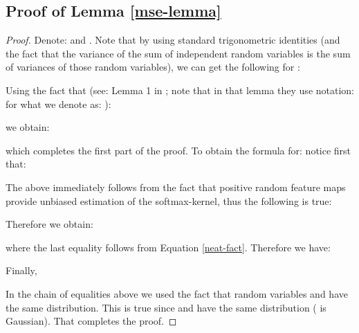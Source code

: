 \subsection{Proof of Lemma \ref{mse-lemma}}
\begin{proof}
Denote:  and .
Note that by using standard trigonometric identities (and the fact that the variance of the sum of independent random variables is the sum of variances of those random variables), we can get the following for :

Using the fact that (see: Lemma 1 in \citep{ort}; note that in that lemma they use notation:  for what we denote as: ):

we obtain:

which completes the first part of the proof.
To obtain the formula for: 
notice first that:

The above immediately follows from the fact that positive random feature maps provide unbiased estimation of the softmax-kernel, thus the following is true:


Therefore we obtain:

where the last equality follows from Equation \ref{neat-fact}.
Therefore we have:


Finally, 

In the chain of equalities above we used the fact that random variables  and 
 have the same distribution. This is true since  and  have the same distribution ( is Gaussian).
That completes the proof.
\end{proof}

